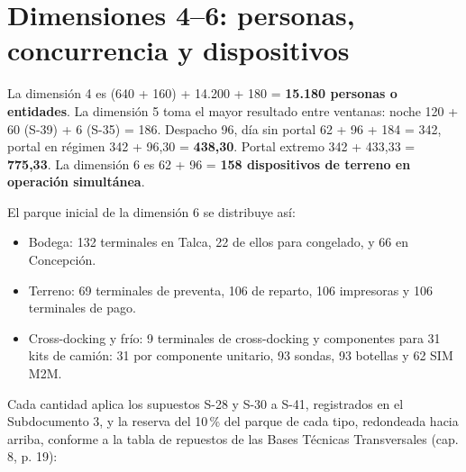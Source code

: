 \section{Dimensiones 4–6: personas, concurrencia y dispositivos}
\label{sec:anexo-4b-dimensiones-4-6}

La dimensión 4 es (640 + 160) + 14.200 + 180 = \textbf{15.180 personas o entidades}. La dimensión 5 toma el mayor resultado entre ventanas: noche 120 + 60 (S-39) + 6 (S-35) = 186. Despacho 96, día sin portal 62 + 96 + 184 = 342, portal en régimen 342 + 96,30 = \textbf{438,30}. Portal extremo 342 + 433,33 = \textbf{775,33}. La dimensión 6 es 62 + 96 = \textbf{158 dispositivos de terreno en operación simultánea}.

El parque inicial de la dimensión 6 se distribuye así:

\begin{itemize}
  \item Bodega: 132 terminales en Talca, 22 de ellos para congelado, y 66 en Concepción.
  \item Terreno: 69 terminales de preventa, 106 de reparto, 106 impresoras y 106 terminales de pago.
  \item Cross-docking y frío: 9 terminales de cross-docking y componentes para 31 kits de camión: 31 por componente unitario, 93 sondas, 93 botellas y 62 SIM M2M.
\end{itemize}

Cada cantidad aplica los supuestos S-28 y S-30 a S-41, registrados en el Subdocumento 3, y la reserva del 10\,\% del parque de cada tipo, redondeada hacia arriba, conforme a la tabla de repuestos de las Bases Técnicas Transversales (cap. 8, p. 19):

